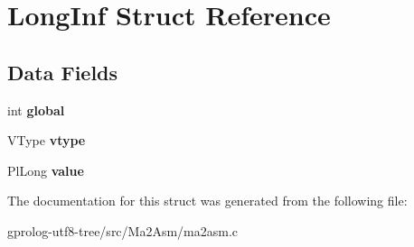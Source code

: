 \hypertarget{structLongInf}{}\section{Long\+Inf Struct Reference}
\label{structLongInf}
\subsection*{Data Fields}
\begin{DoxyCompactItemize}
\item 
int {\bfseries global}\hypertarget{structLongInf_a2a21c022832de0f854940c3a39233cec}{}\label{structLongInf_a2a21c022832de0f854940c3a39233cec}

\item 
V\+Type {\bfseries vtype}\hypertarget{structLongInf_a43f3ac657d3dabca28037f16891e4092}{}\label{structLongInf_a43f3ac657d3dabca28037f16891e4092}

\item 
Pl\+Long {\bfseries value}\hypertarget{structLongInf_ab45336cb32ee695b77f51b6490a81875}{}\label{structLongInf_ab45336cb32ee695b77f51b6490a81875}

\end{DoxyCompactItemize}


The documentation for this struct was generated from the following file\+:\begin{DoxyCompactItemize}
\item 
gprolog-\/utf8-\/tree/src/\+Ma2\+Asm/ma2asm.\+c\end{DoxyCompactItemize}
